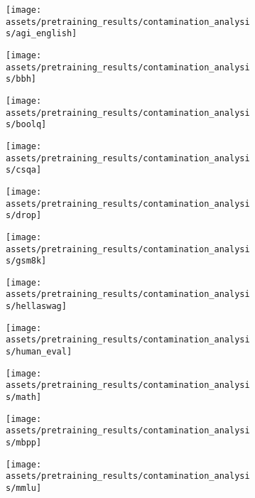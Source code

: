 \begin{figure}
    \begin{subfigure}[b]{0.246\textwidth}
    \texttt{[image: assets/pretraining\_results/contamination\_analysis/agi\_english]}
    \end{subfigure}
    \begin{subfigure}[b]{0.246\textwidth}
    \texttt{[image: assets/pretraining\_results/contamination\_analysis/bbh]}
    \end{subfigure}
    \begin{subfigure}[b]{0.246\textwidth}
    \texttt{[image: assets/pretraining\_results/contamination\_analysis/boolq]}
    \end{subfigure}
    \begin{subfigure}[b]{0.246\textwidth}
    \texttt{[image: assets/pretraining\_results/contamination\_analysis/csqa]}
    \end{subfigure}
    \begin{subfigure}[b]{0.246\textwidth}
    \texttt{[image: assets/pretraining\_results/contamination\_analysis/drop]}
    \end{subfigure}
    \begin{subfigure}[b]{0.246\textwidth}
    \texttt{[image: assets/pretraining\_results/contamination\_analysis/gsm8k]}
    \end{subfigure}
    \begin{subfigure}[b]{0.246\textwidth}
    \texttt{[image: assets/pretraining\_results/contamination\_analysis/hellaswag]}
    \end{subfigure}
    \begin{subfigure}[b]{0.246\textwidth}
    \texttt{[image: assets/pretraining\_results/contamination\_analysis/human\_eval]}
    \end{subfigure}
    \begin{subfigure}[b]{0.246\textwidth}
    \texttt{[image: assets/pretraining\_results/contamination\_analysis/math]}
    \end{subfigure}
    \begin{subfigure}[b]{0.246\textwidth}
    \texttt{[image: assets/pretraining\_results/contamination\_analysis/mbpp]}
    \end{subfigure}
    \begin{subfigure}[b]{0.246\textwidth}
    \texttt{[image: assets/pretraining\_results/contamination\_analysis/mmlu]}

\end{subfigure}
\end{figure}
